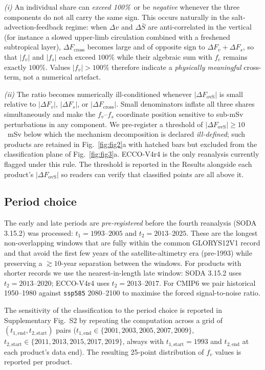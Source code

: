 \documentclass[12pt,a4paper]{article}
\newcommand{\Fovs}{F_\mathrm{ovS}}
\newcommand{\dFv}{\Delta F_v}
\newcommand{\dFs}{\Delta F_s}
\newcommand{\dFc}{\Delta F_\mathrm{cross}}
\begin{document}
\emph{(i)} An individual share can \emph{exceed 100\%}\ or be
\emph{negative} whenever the three components do not all carry the
same sign. This occurs naturally in the salt-advection-feedback
regime: when $\Delta v$ and $\Delta\bar{S}$ are anti-correlated in
the vertical (for instance a slowed upper-limb circulation combined
with a freshened subtropical layer), $\dFc$ becomes large and of
opposite sign to $\dFv + \dFs$, so that $|f_v|$ and $|f_s|$ each
exceed $100\%$ while their algebraic sum with $f_c$ remains exactly
$100\%$. Values $|f_v| > 100\%$ therefore indicate a \emph{physically
meaningful} cross-term, not a numerical artefact.

\emph{(ii)} The ratio becomes numerically ill-conditioned whenever
$|\Delta\Fovs|$ is small relative to $|\dFv|$, $|\dFs|$, or $|\dFc|$.
Small denominators inflate all three shares simultaneously and make
the $f_v$--$f_s$ coordinate position sensitive to sub-mSv
perturbations in any component. We pre-register a threshold of
$|\Delta\Fovs| \ge 10$~mSv below which the mechanism decomposition is
declared \emph{ill-defined}; such products are retained in
Fig.~\ref{fig:fig2}a with hatched bars but excluded from the
classification plane of Fig.~\ref{fig:fig3}a. ECCO-V4r4 is the only
reanalysis currently flagged under this rule. The threshold is
reported in the Results alongside each product's $|\Delta\Fovs|$ so
readers can verify that classified points are all above it.

\subsection*{Period choice}

The early and late periods are \emph{pre-registered} before the fourth
reanalysis (SODA 3.15.2) was processed: $t_1 = 1993$--$2005$ and
$t_2 = 2013$--$2025$. These are the longest non-overlapping windows
that are fully within the common GLORYS12V1 record and that avoid
the first few years of the satellite-altimetry era (pre-1993) while
preserving a $\gtrsim 10$-year separation between the windows. For
products with shorter records we use the nearest-in-length late
window: SODA 3.15.2 uses $t_2 = 2013$--$2020$; ECCO-V4r4 uses
$t_2 = 2013$--$2017$. For CMIP6 we pair historical 1950--1980 against
\texttt{ssp585} 2080--2100 to maximise the forced signal-to-noise
ratio.

The sensitivity of the classification to the period choice is
reported in Supplementary Fig.~S2 by repeating the computation
across a grid of $(t_{1,\text{end}}, t_{2,\text{start}})$ pairs
($t_{1,\text{end}}\in\{2001, 2003, 2005, 2007, 2009\}$,
$t_{2,\text{start}}\in\{2011, 2013, 2015, 2017, 2019\}$, always
with $t_{1,\text{start}}=1993$ and $t_{2,\text{end}}$ at each
product's data end). The resulting 25-point distribution of $f_v$
values is reported per product.
\end{document}
